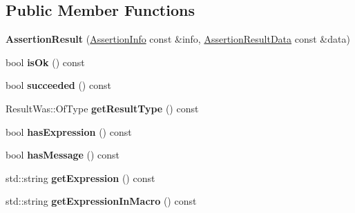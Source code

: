 \subsection*{Public Member Functions}
\begin{DoxyCompactItemize}
\item 
{\bfseries Assertion\+Result} (\hyperlink{structCatch_1_1AssertionInfo}{Assertion\+Info} const \&info, \hyperlink{structCatch_1_1AssertionResultData}{Assertion\+Result\+Data} const \&data)\hypertarget{classCatch_1_1AssertionResult_ab58aeec27052ba400633ed0e36cea692}{}\label{classCatch_1_1AssertionResult_ab58aeec27052ba400633ed0e36cea692}

\item 
bool {\bfseries is\+Ok} () const \hypertarget{classCatch_1_1AssertionResult_a70fb6aa62a38db3bdcafb4bb134afb21}{}\label{classCatch_1_1AssertionResult_a70fb6aa62a38db3bdcafb4bb134afb21}

\item 
bool {\bfseries succeeded} () const \hypertarget{classCatch_1_1AssertionResult_a5404062147930354afeb154de7cbaa7e}{}\label{classCatch_1_1AssertionResult_a5404062147930354afeb154de7cbaa7e}

\item 
Result\+Was\+::\+Of\+Type {\bfseries get\+Result\+Type} () const \hypertarget{classCatch_1_1AssertionResult_aa90bec8064879a62fcdc8e1079bcdba1}{}\label{classCatch_1_1AssertionResult_aa90bec8064879a62fcdc8e1079bcdba1}

\item 
bool {\bfseries has\+Expression} () const \hypertarget{classCatch_1_1AssertionResult_a45551f4f092c640ffce0cdd8a94f4b62}{}\label{classCatch_1_1AssertionResult_a45551f4f092c640ffce0cdd8a94f4b62}

\item 
bool {\bfseries has\+Message} () const \hypertarget{classCatch_1_1AssertionResult_ab22a1c9baa182aeb2549fffeb8294d9e}{}\label{classCatch_1_1AssertionResult_ab22a1c9baa182aeb2549fffeb8294d9e}

\item 
std\+::string {\bfseries get\+Expression} () const \hypertarget{classCatch_1_1AssertionResult_a6105300b90d66b5c11b69813f83d074d}{}\label{classCatch_1_1AssertionResult_a6105300b90d66b5c11b69813f83d074d}

\item 
std\+::string {\bfseries get\+Expression\+In\+Macro} () const \hypertarget{classCatch_1_1AssertionResult_ac368a7490af7669decd58efea7d7dc54}{}\label{classCatch_1_1AssertionResult_ac368a7490af7669decd58efea7d7dc54}


\end{DoxyCompactItemize}
